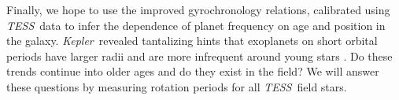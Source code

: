 \documentclass[letterpaper,12pt,preprint]{hack_aastex}
\newcommand{\Kepler}{{\it Kepler}}
\newcommand{\kepler}{\Kepler}
\newcommand{\TESS}{{\it TESS}}
\begin{document}
Finally, we hope to use the improved gyrochronology relations, calibrated
using \TESS\ data to infer the dependence of planet frequency on age and
position in the galaxy.
\kepler\ revealed tantalizing hints that exoplanets on short orbital periods
have larger radii and are more infrequent around young stars \citep{mann2017a,
mann2017b, rizzuto2017}.
Do these trends continue into older ages and do they exist in the field?
We will answer these questions by measuring rotation periods for all \TESS\
field stars.



\end{document}
